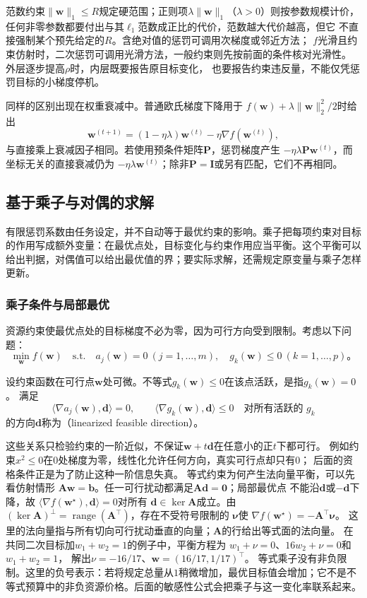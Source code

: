 范数约束$\|\bm w\|_1\leq R$规定硬范围；正则项$\lambda\|\bm w\|_1$（$\lambda>0$）则按参数规模计价，
任何非零参数都要付出与其$\ell_1$范数成正比的代价，范数越大代价越高，但它
不直接强制某个预先给定的$R$。含绝对值的惩罚可调用次梯度或邻近方法；
$f$光滑且约束仿射时，二次惩罚可调用光滑方法，一般约束则先按前面的条件核对光滑性。
外层逐步提高$\rho$时，内层既要报告原目标变化，
也要报告约束违反量，不能仅凭惩罚目标的小梯度停机。

同样的区别出现在权重衰减中。普通欧氏梯度下降用于
$f(\bm{w})+\lambda\lVert\bm{w}\rVert_2^2/2$时给出
\[
  \bm{w}^{(t+1)}
  =(1-\eta\lambda)\bm{w}^{(t)}-\eta\nabla f(\bm{w}^{(t)}),
\]
与直接乘上衰减因子相同。若使用预条件矩阵$\bm{P}$，惩罚梯度产生
$-\eta\lambda\bm{P}\bm{w}^{(t)}$，而坐标无关的直接衰减仍为
$-\eta\lambda\bm{w}^{(t)}$；除非$\bm{P}=\bm{I}$或另有匹配，它们不再相同。

\subsection{基于乘子与对偶的求解}
\label{sec:opt-multiplier-dual-methods}

有限惩罚系数由任务设定，并不自动等于最优约束的影响。乘子把每项约束对目标的作用写成额外变量：在最优点处，目标变化与约束作用应当平衡。这个平衡可以给出判据，对偶值可以给出最优值的界；要实际求解，还需规定原变量与乘子怎样更新。

\subsubsection{乘子条件与局部最优}
\label{sec:opt-kkt}

资源约束使最优点处的目标梯度不必为零，因为可行方向受到限制。考虑以下问题：
\[
  \min_{\bm{w}}f(\bm{w})
  \quad\text{s.t.}\quad
  a_j(\bm{w})=0\ (j=1,\ldots,m),\quad
  g_k(\bm{w})\leq0\ (k=1,\ldots,p)\text{。}
\]
\begin{definition}[活跃约束与线性化可行方向]
\label{def:opt-linearized-feasible-direction}
设约束函数在可行点$\bm w$处可微。不等式$g_k(\bm w)\leq0$在该点活跃，是指$g_k(\bm w)=0$。
满足
\[
  \langle\nabla a_j(\bm{w}),\bm{d}\rangle=0,\qquad
  \langle\nabla g_k(\bm{w}),\bm{d}\rangle\leq0
  \quad\text{对所有活跃的 }g_k
\]
的方向$\bm{d}$称为（linearized feasible direction）。
\end{definition}
这些关系只检验约束的一阶近似，不保证$\bm w+t\bm d$在任意小的正$t$下都可行。
例如约束$x^2\leq0$在$0$处梯度为零，线性化允许任何方向，真实可行点却只有$0$；
后面的资格条件正是为了防止这种一阶信息失真。
等式约束为何产生法向量平衡，可以先看仿射情形
$\bm{A}\bm{w}=\bm{b}$。任一可行扰动都满足$\bm{A}\bm{d}=\bm{0}$；局部最优点
不能沿$\bm{d}$或$-\bm{d}$下降，故
$\langle\nabla f(\bm{w}^{\star}),\bm{d}\rangle=0$对所有
$\bm{d}\in\ker\bm{A}$成立。由
$(\ker\bm{A})^\perp=\operatorname{range}(\bm{A}^{\top})$，存在不受符号限制的
$\bm{\nu}$使
$\nabla f(\bm{w}^{\star})=-\bm{A}^{\top}\bm{\nu}$。
这里的法向量指与所有切向可行扰动垂直的向量；$\bm A$的行给出等式面的法向量。
在共同二次目标加$w_1+w_2=1$的例子中，平衡方程为
$w_1+\nu=0$、$16w_2+\nu=0$和$w_1+w_2=1$，
解出$\nu=-16/17$、$\bm w=(16/17,1/17)^\top$。
等式乘子没有非负限制。这里的负号表示：若将规定总量从$1$稍微增加，最优目标值会增加；它不是不等式预算中的非负资源价格。后面的敏感性公式会把乘子与这一变化率联系起来。

